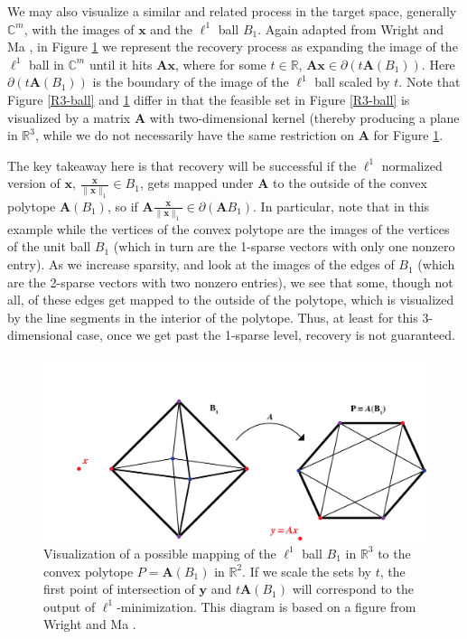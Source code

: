 \documentclass[12pt,a4paper]{amsart}
\numberwithin{equation}{section}
\theoremstyle{plain}
\theoremstyle{definition}
\newcommand{\BR}{\mathbb R}
\newcommand{\BC}{\mathbb C}
\newcommand{\bdy}{\mathbf{y}}
\newcommand{\bdx}{\mathbf{x}}
\newcommand{\bdA}{\mathbf{A}}
\begin{document}
We may also visualize a similar and related process in the target space, generally $\BC^m$, with the images of $\bdx$ and the $\ell^1$ ball $B_1$. Again adapted from Wright and Ma \cite{wm}, in Figure \ref{polytope} we represent the recovery process as expanding the image of the $\ell^1$ ball in $\BC^m$ until it hits $\bdA\bdx$, where for some $t\in\BR$, $\bdA\bdx\in\partial(t\bdA(B_1))$. Here $\partial(t\bdA(B_1))$ is the boundary of the image of the $\ell^1$ ball scaled by $t$. Note that Figure \ref{R3-ball} and \ref{polytope} differ in that the feasible set in Figure \ref{R3-ball} is visualized by a matrix $\bdA$ with two-dimensional kernel (thereby producing a plane in $\BR^3$, while we do not necessarily have the same restriction on $\bdA$ for Figure \ref{polytope}.

The key takeaway here is that recovery will be successful if the $\ell^1$ normalized version of $\bdx$, $\frac{\bdx}{\|\bdx\|_1}\in B_1$, gets mapped under $\bdA$ to the outside of the convex polytope $\bdA(B_1)$, so if $\bdA\frac{\bdx}{\|\bdx\|_1}\in\partial(\bdA B_1)$. In particular, note that in this example while the vertices of the convex polytope are the images of the vertices of the unit ball $B_1$ (which in turn are the 1-sparse vectors with only one nonzero entry). As we increase sparsity, and look at the images of the edges of $B_1$ (which are the 2-sparse vectors with two nonzero entries), we see that some, though not all, of these edges get mapped to the outside of the polytope, which is visualized by the line segments in the interior of the polytope. Thus, at least for this 3-dimensional case, once we get past the 1-sparse level, recovery is not guaranteed.

\begin{figure}
    \centering
    \includegraphics[scale = 0.7]{l1ball_transform_final.png}
    \caption{Visualization of a possible mapping of the $\ell^1$ ball $B_1$ in $\BR^3$ to the convex polytope $P=\bdA(B_1)$ in $\BR^2$. If we scale the sets by $t$, the first point of intersection of $\bdy$ and $t\bdA(B_1)$ will correspond to the output of $\ell^1$-minimization. This diagram is based on a figure from Wright and Ma \cite{wm}.}
    \label{polytope}
\end{figure}
\end{document}
